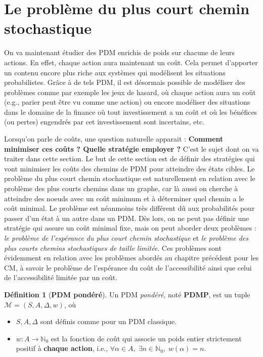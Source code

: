 \documentclass[12pt,a4paper]{report}
\theoremstyle{definition}%
\newtheorem{definition}{Définition}[chapter]
\theoremstyle{remark}
\let\labelitemi\labelitemii
\begin{document}
\section{Le problème du plus court chemin stochastique}
On va maintenant étudier des PDM enrichis de poids sur chacune de leurs
actions. En effet, chaque action aura maintenant un coût. Cela permet
d'apporter un contenu encore plus riche aux systèmes qui modélisent les
situations probabilistes. Grâce à de tels PDM, il est désormais possible de modéliser
des problèmes comme par exemple les jeux de hasard, où chaque action aura un coût (e.g., parier peut être vu comme une action) ou encore
modéliser des situations dans le domaine de la finance où tout investissement
a un coût et où les bénéfices (ou pertes) engendrés par cet investissement sont
incertains, etc.
\par
Lorsqu'on parle de coûts, une question naturelle apparait :
\textbf{Comment minimiser ces coûts ? Quelle stratégie employer ?} C'est
le sujet dont on va traiter dans cette section.
Le but de cette section est de définir des stratégies qui vont minimiser les
coûts des chemins de PDM pour atteindre des états cibles.
Le problème du plus court
chemin stochastique est naturellement en relation avec le problème des plus
courts chemins dans un graphe, car là aussi on cherche à atteindre des noeuds
avec un coût minimum et à déterminer quel chemin a le coût minimal. Le problème est néanmoins très différent dû aux
probabilités pour passer d'un état à un autre dans un PDM. Dès lors, on ne
peut pas définir une stratégie qui assure un coût minimal fixe, mais on peut
aborder deux problèmes :
\textit{le problème de l'espérance du plus court chemin stochastique} et
\textit{le problème des plus courts chemins stochastiques de taille limitée}.
Ces problèmes sont évidemment en relation avec les problèmes abordés au
chapitre précédent pour les CM, à savoir le problème de l'espérance du coût de l'accessibilité ainsi
que celui de l'accessibilité limitée par un coût.

\begin{definition}[\textbf{PDM pondéré}]
	Un PDM \textit{pondéré}, noté \textbf{PDMP}, est un tuple \\$\mathcal{M} = (S, A, \Delta, w)$, où
	\begin{itemize}
		\renewcommand{\labelitemi}{\tiny$\bullet$}
		\item $S, A, \Delta$ sont définis comme pour un PDM classique.
		\item $w : A \rightarrow \mathbb{N}_0$ est la fonction de coût qui
			associe un poids entier strictement positif à \textbf{chaque action}, i.e.,
			$\forall \alpha \in A,\; \exists n \in \mathbb{N}_0, \; w(\alpha) = n$.
	\end{itemize}
\end{definition}
\end{document}
